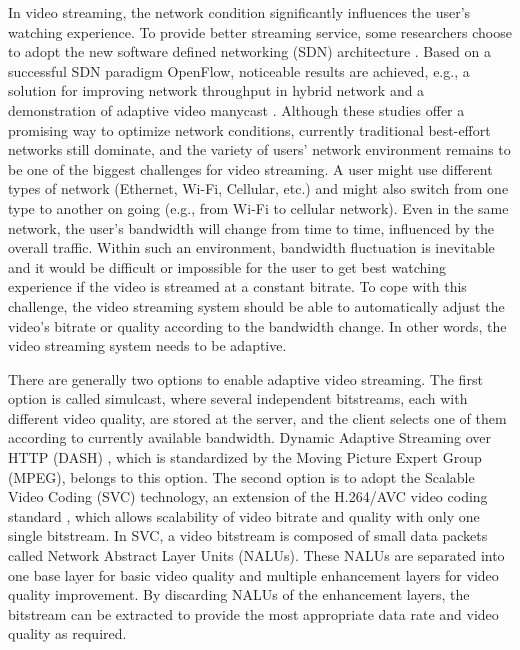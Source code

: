 \documentclass[journal]{IEEEtran}
\begin{document}
In video streaming, the network condition significantly influences the user's watching experience. To provide better streaming service, some researchers choose to adopt the new software defined networking (SDN) architecture \cite{Egilmez14}. Based on a successful SDN paradigm OpenFlow, noticeable results are achieved, e.g., a solution for improving network throughput in hybrid network \cite{Li14} and a demonstration of adaptive video manycast \cite{Xue15}. Although these studies offer a promising way to optimize network conditions, currently traditional best-effort networks still dominate, and the variety of users' network environment remains to be one of the biggest challenges for video streaming. A user might use different types of network (Ethernet, Wi-Fi, Cellular, etc.) and might also switch from one type to another on going (e.g., from Wi-Fi to cellular network). Even in the same network, the user's bandwidth will change from time to time, influenced by the overall traffic. Within such an environment, bandwidth fluctuation is inevitable and it would be difficult or impossible for the user to get best watching experience if the video is streamed at a constant bitrate. To cope with this challenge, the video streaming system should be able to automatically adjust the video's bitrate or quality according to the bandwidth change. In other words, the video streaming system needs to be adaptive.

There are generally two options to enable adaptive video streaming. The first option is called simulcast, where several independent bitstreams, each with different video quality, are stored at the server, and the client selects one of them according to currently available bandwidth. Dynamic Adaptive Streaming over HTTP (DASH) \cite{DASH}, which is standardized by the Moving Picture Expert Group (MPEG), belongs to this option. The second option is to adopt the Scalable Video Coding (SVC) \cite{SVC} technology, an extension of the H.264/AVC video coding standard \cite{SVCOverview}, which allows scalability of video bitrate and quality with only one single bitstream. In SVC, a video bitstream is composed of small data packets called Network Abstract Layer Units (NALUs). These NALUs are separated into one base layer for basic video quality and multiple enhancement layers for video quality improvement. By discarding NALUs of the enhancement layers, the bitstream can be extracted to provide the most appropriate data rate and video quality as required.
\end{document}
